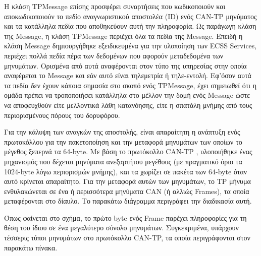 \documentclass[a4paper,nobib,justified]{tufte-book}
\begin{document}
Η κλάση TPMessage επίσης προσφέρει συναρτήσεις που κωδικοποιούν και αποκωδικοποιούν το πεδίο αναγνωριστικού αποστολέα (ID) ενός CAN-TP μηνύματος και τα κατάλληλα πεδία που αποθηκεύουν αυτή την πληροφορία. Ως παράγωγη κλάση της Message, η κλάση TPMessage περιέχει όλα τα πεδία της Message. Επειδή η κλάση Message δημιουργήθηκε εξειδικευμένα για την υλοποίηση των ECSS Services, περιέχει πολλά πεδία πέρα των δεδομένων που αφορούν μεταδεδομένα των μηνυμάτων. Ορισμένα από αυτά αναφέρονται στον τύπο της υπηρεσίας στην οποία αναφέρεται το Message και εάν αυτό είναι τηλεμετρία ή τηλε-εντολή. Εφ'όσον αυτά τα πεδία δεν έχουν κάποια σημασία στο σκοπό ενός TPMessage, έχει σημειωθεί ότι η ομάδα πρέπει να τροποποιήσει κατάλληλα στο μέλλον την δομή ενός Message ώστε να αποφευχθούν είτε μελλοντικά λάθη κατανόησης, είτε η σπατάλη μνήμης από τους περιορισμένους πόρους του δορυφόρου. 

Για την κάλυψη των αναγκών της αποστολής, είναι απαραίτητη η ανάπτυξη ενός πρωτοκόλλου για την πακετοποίηση και την μεταφορά μηνυμάτων των οποίων το μέγεθος ξεπερνά τα 64-byte. Με βάση το πρωτόκολλο CAN-TP , υλοποιήθηκε ένας μηχανισμός που δέχεται μηνύματα ανεξαρτήτου μεγέθους (με πραγματικό όριο τα 1024-byte λόγω περιορισμών μνήμης), και τα χωρίζει σε πακέτα των 64-byte όταν αυτό κρίνεται απαραίτητο. Για την μεταφορά αυτών των μηνυμάτων, το TP μήνυμα ενθυλακώνεται σε ένα ή περισσότερα μηνύματα CAN (ή αλλιώς Frames), τα οποία μεταφέρονται στο δίαυλο. Το παρακάτω διάγραμμα περιγράφει την διαδικασία αυτή. 

Όπως φαίνεται στο σχήμα, το πρώτο byte ενός Frame παρέχει πληροφορίες για τη θέση του ίδιου σε ένα μεγαλύτερο σύνολο μηνυμάτων. Συγκεκριμένα, υπάρχουν τέσσερις τύποι μηνυμάτων στο πρωτόκολλο CAN-TP, τα οποία περιγράφονται στον παρακάτω πίνακα.
\end{document}
